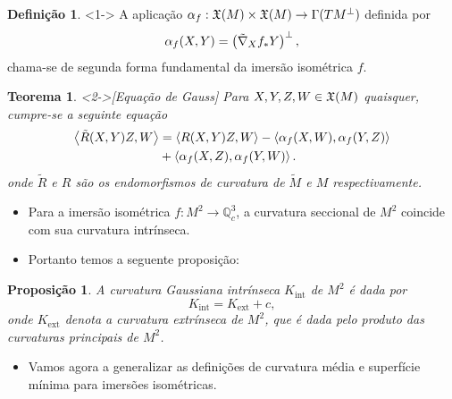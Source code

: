 \documentclass[10pt,a4paper]{beamer}
\newtheorem{teorema}{Teorema}
\newtheorem{proposicao}{Proposição}
\theoremstyle{definition}
\newtheorem{definicao}{Definição}
\begin{document}
\begin{frame}
	
	\begin{definicao}<1->
		A aplicação $\alpha_f: \mathfrak{X}(M) \times \mathfrak{X}(M) \rightarrow \Gamma(TM^\perp)$ definida por
		\begin{equation*}
		\alpha_f(X,Y) = \left( \tilde{\nabla}_X f_* Y \right)^\perp,
		\end{equation*}
		chama-se de \alert{segunda forma fundamental} da imersão isométrica $f$.
	\end{definicao}
	
	\begin{teorema}<2->[Equação de Gauss]
		Para $X,Y,Z,W \in \mathfrak{X}(M)$ quaisquer, cumpre-se a seguinte equação
		\begin{align*}
			\left\langle \tilde{R}(X,Y)Z,W \right\rangle &= \left\langle R(X,Y)Z,W \right\rangle - \left\langle \alpha_f(X,W),\alpha_f(Y,Z) \right\rangle\\
			&+ \left\langle \alpha_f(X,Z),\alpha_f(Y,W) \right\rangle.
		\end{align*}
		onde $\tilde{R}$ e $R$ são os endomorfismos de curvatura de $\tilde{M}$ e $M$ respectivamente.
	\end{teorema}

\end{frame}

\begin{frame}

	\begin{itemize}
		\item Para a imersão isométrica $f: M^2 \rightarrow \mathbb{Q}^3_c$, a curvatura seccional de $M^2$ coincide com sua curvatura intrínseca.
		\pause
		\item Portanto temos a seguente proposição:
		\pause
	\end{itemize}
	

	\begin{proposicao}
		A curvatura Gaussiana intrínseca $K_{\text{int}}$ de $M^2$ é dada por
		\begin{equation*}
			K_{\text{int}} = K_{\text{ext}} + c,
		\end{equation*}
		onde $K_{\text{ext}}$ denota a curvatura extrínseca de $M^2$, que é dada pelo produto das curvaturas principais de $M^2$.
	\end{proposicao}

	\pause

	\begin{itemize}
		\item Vamos agora a generalizar as definições de curvatura média e superfície mínima para imersões isométricas.
	\end{itemize}
	
\end{frame}
\end{document}
